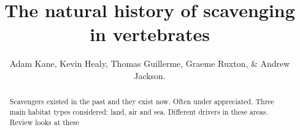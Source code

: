 \documentclass[a4paper,12pt]{article}
\title{The natural history of scavenging in vertebrates}
\author{Adam Kane, Kevin Healy, Thomas Guillerme, Graeme Ruxton, \& Andrew Jackson.}
\begin{document}

\maketitle


\begin{abstract}
  Scavengers existed in the past and they exist now. 
  Often under appreciated. 
  Three main habitat types considered: land, air and sea. 
  Different drivers in these areas. 
  Review looks at these 
\end{abstract}


\newpage
\end{document}
